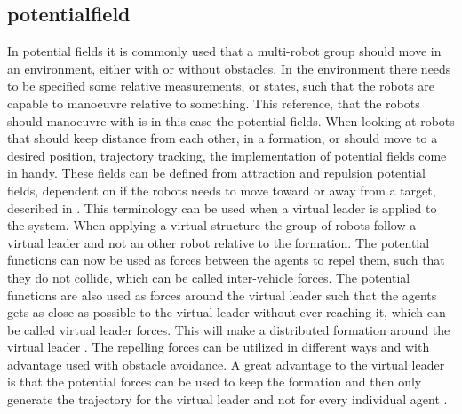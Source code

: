 \subsection{potentialfield}
In potential fields it is commonly used that a multi-robot group should move in an environment, either with or without obstacles. In the environment there needs to be specified some relative measurements, or states, such that the robots are capable to manoeuvre relative to something. This reference, that the robots should manoeuvre with is in this case the potential fields. When looking at robots that should keep distance from each other, in a formation, or should move to a desired position, trajectory tracking, the implementation of potential fields come in handy. These fields can be defined from attraction and repulsion potential fields, dependent on if the robots needs to move toward or away from a target, described in \citep{PS:02}. This terminology can be used when a virtual leader is applied to the system. When applying a virtual structure the group of robots follow a virtual leader and not an other robot relative to the formation. The potential functions can now be used as forces between the agents to repel them, such that they do not collide, which can be called inter-vehicle forces. The potential functions are also used as forces around the virtual leader such that the agents gets as close as possible to the virtual leader without ever reaching it, which can be called virtual leader forces. This will make a distributed formation around the virtual leader \citep{1655803}. The repelling forces can be utilized in different ways and with advantage used with obstacle avoidance. A great advantage to the virtual leader is that the potential forces can be used to keep the formation and then only generate the trajectory for the virtual leader and not for every individual agent \citep{1655803}.

